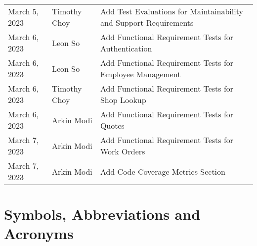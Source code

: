 \documentclass[12pt, titlepage]{article}
\begin{document}
\begin{table}[hp]
\begin{tabularx}{\textwidth}{llX}
		March 5, 2023     & Timothy Choy          & Add Test Evaluations for Maintainability and Support Requirements \\
		March 6, 2023     & Leon So               & Add Functional Requirement Tests for Authentication               \\
		March 6, 2023     & Leon So               & Add Functional Requirement Tests for Employee Management          \\
		March 6, 2023     & Timothy Choy          & Add Functional Requirement Tests for Shop Lookup                  \\
		March 6, 2023     & Arkin Modi            & Add Functional Requirement Tests for Quotes                       \\
		March 7, 2023     & Arkin Modi            & Add Functional Requirement Tests for Work Orders                  \\
		March 7, 2023     & Arkin Modi            & Add Code Coverage Metrics Section                                 \\
		\bottomrule
	\end{tabularx}
\end{table}
\newpage

\section{Symbols, Abbreviations and Acronyms}
\end{document}
